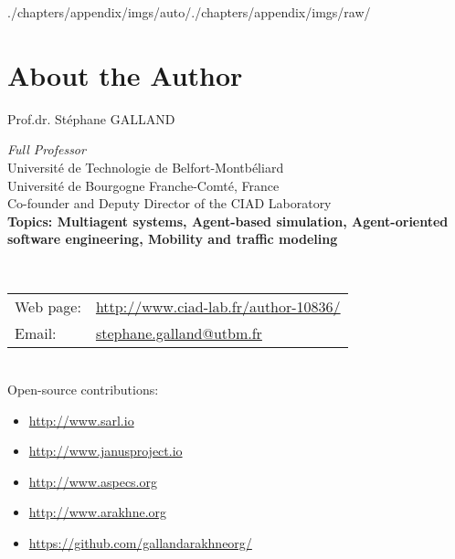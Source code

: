 \begin{graphicspathcontext}{{./chapters/appendix/imgs/auto/}{./chapters/appendix/imgs/raw/}}
\section{About the Author}
\begin{frame}{Prof\string.dr\string. St\'ephane GALLAND}
	\begin{minipage}[t]{.75\linewidth}
		\begin{raggedright}
			\textit{Full Professor} \\[.5cm]
			{\scriptsize
				Universit\'e de Technologie de Belfort-Montb\'eliard\\
				Universit\'e de Bourgogne Franche-Comt\'e, France \\
				Co-founder and Deputy Director of the CIAD Laboratory} \\[.25cm]
			\textbf{Topics: Multiagent systems, Agent-based simulation, Agent-oriented software engineering, Mobility and traffic modeling} \\[.5cm]
		\end{raggedright}
	\end{minipage}%
	\hfill%
	 \\[.5cm]%
	\begin{raggedright}
		\scriptsize \begin{tabularx}{\linewidth}{@{}lX@{}}
			Web page: & \url{http://www.ciad-lab.fr/author-10836/} \\
			Email: & \href{mailto:stephane.galland@utbm.fr}{stephane.galland@utbm.fr} \\
		\end{tabularx} \\[.5cm]
		\scriptsize Open-source contributions:\begin{itemize}\tiny
			\item \url{http://www.sarl.io}
			\item \url{http://www.janusproject.io}
			\item \url{http://www.aspecs.org}
			\item \url{http://www.arakhne.org}
			\item \url{https://github.com/gallandarakhneorg/}
		\end{itemize}
	\end{raggedright}
\end{frame}

%

\end{graphicspathcontext}